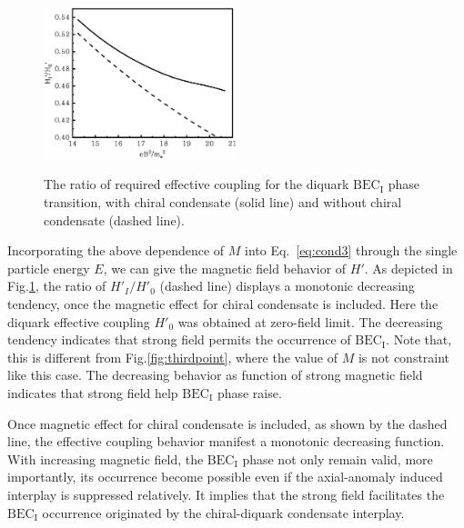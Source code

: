 \documentclass[prd, showpacs,nofootinbib,amsmath,amssymb,12pt]{revtex4}
\begin{document}
\begin{figure}[h]
  \caption{  The ratio of required effective coupling  for  the diquark $\text{BEC}_\text{I}$ phase transition, with chiral condensate (solid line) and without chiral condensate (dashed line). }
  \centering
    \includegraphics[width=0.5\textwidth]{high.eps}
    \label{fig:h}
\end{figure}





Incorporating the above dependence of $M$  into Eq.~\eqref{eq:cond3} through the  single particle energy $E$, we can give the magnetic field behavior of $H'$.
As depicted in Fig.\ref{fig:h}, the ratio of $H'_{I}/H'_0$ (dashed line)  displays a monotonic decreasing tendency, once the magnetic effect for chiral condensate is included. Here the diquark effective coupling $H'_0$  was obtained at zero-field limit. The decreasing tendency  indicates that strong field permits the occurrence of $\text{BEC}_\text{I}$.
Note that, this is different from Fig.\ref{fig:thirdpoint}, where the value of $M$ is not constraint like this case.
The decreasing behavior as function of strong magnetic field indicates that strong field help  $\text{BEC}_\text{I}$ phase raise.

Once magnetic effect for chiral condensate is included, as shown by the dashed line, the effective coupling behavior manifest a monotonic decreasing function.
With increasing magnetic field, the $\text{BEC}_\text{I}$ phase not only remain valid, more importantly, its occurrence become possible even if the axial-anomaly induced interplay is suppressed relatively.
It implies that the strong field facilitates the $\text{BEC}_\text{I}$ occurrence originated by the chiral-diquark condensate interplay.
\end{document}
